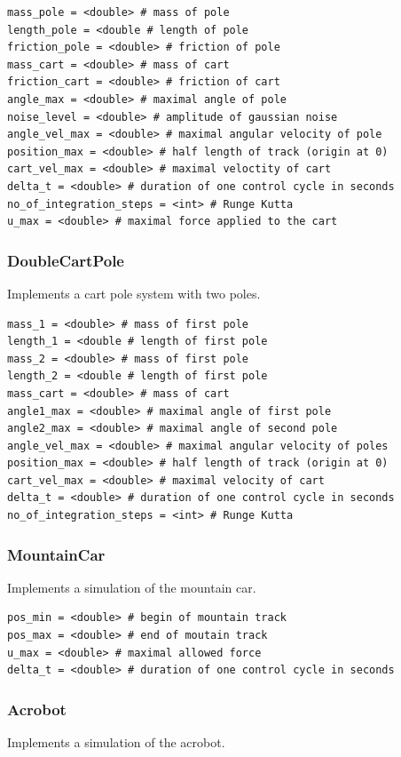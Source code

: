 \documentclass[a4paper,12pt,german]{article}
\begin{document}
\begin{verbatim}
mass_pole = <double> # mass of pole
length_pole = <double # length of pole
friction_pole = <double> # friction of pole
mass_cart = <double> # mass of cart
friction_cart = <double> # friction of cart
angle_max = <double> # maximal angle of pole 
noise_level = <double> # amplitude of gaussian noise
angle_vel_max = <double> # maximal angular velocity of pole
position_max = <double> # half length of track (origin at 0)
cart_vel_max = <double> # maximal veloctity of cart
delta_t = <double> # duration of one control cycle in seconds
no_of_integration_steps = <int> # Runge Kutta 
u_max = <double> # maximal force applied to the cart
\end{verbatim}

\subsubsection{DoubleCartPole}
Implements a cart pole system with two poles. 

\begin{verbatim}
mass_1 = <double> # mass of first pole
length_1 = <double # length of first pole
mass_2 = <double> # mass of first pole
length_2 = <double # length of first pole
mass_cart = <double> # mass of cart
angle1_max = <double> # maximal angle of first pole 
angle2_max = <double> # maximal angle of second pole 
angle_vel_max = <double> # maximal angular velocity of poles
position_max = <double> # half length of track (origin at 0)
cart_vel_max = <double> # maximal velocity of cart
delta_t = <double> # duration of one control cycle in seconds
no_of_integration_steps = <int> # Runge Kutta 
\end{verbatim}

\subsubsection{MountainCar}
Implements a simulation of the mountain car. 

\begin{verbatim}
pos_min = <double> # begin of mountain track
pos_max = <double> # end of moutain track
u_max = <double> # maximal allowed force
delta_t = <double> # duration of one control cycle in seconds
\end{verbatim}

\subsubsection{Acrobot}
Implements a simulation of the acrobot.
\end{document}
